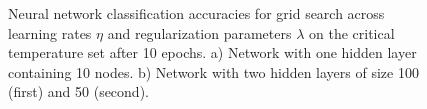 \begin{figure}[H]
    \centering
    \caption{
	Neural network classification accuracies for grid search across 
	learning rates $\eta$ and regularization parameters $\lambda$ on 
	the critical temperature set after 10 epochs.
	a) Network with one hidden layer containing 10 nodes. 
	b) Network with two hidden layers of size 100 (first) and 50
	(second).
	}
    \label{fig:nn-critical}
\end{figure}

